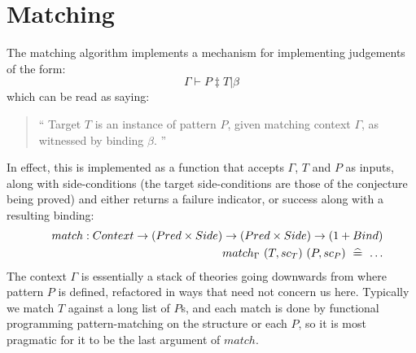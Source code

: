 \section{Matching}\label{sec:matching}

The matching algorithm implements a mechanism for implementing
judgements of the form:
\[
\Gamma\vdash P \ddagger T | \beta
\]
which can be read as saying:
\begin{quote}
  ``
  Target $T$ is an instance of pattern $P$, given matching context $\Gamma$,
  as witnessed by binding $\beta$.
  ''
\end{quote}
In effect,
this is implemented as a function that accepts $\Gamma$, $T$ and $P$
as inputs, along with side-conditions
(the target side-conditions are those of the conjecture being proved)
and either returns a failure indicator, or success along with a resulting
binding:
\begin{eqnarray*}
  && match : Context \rightarrow (Pred\times Side) \rightarrow (Pred\times Side) \rightarrow (1 + Bind)
\\ && match_{\Gamma}~(T,sc_T)~(P,sc_P) \mathrel{~\widehat{=\!\!\!\!=}}~ \ldots
\end{eqnarray*}
The context $\Gamma$ is essentially a stack of theories
going downwards from where pattern $P$ is defined,
refactored in ways that need not concern us here.
Typically we match $T$ against a long list of $P$s,
and each match is done by functional programming pattern-matching
on the structure or each $P$, so it is most pragmatic for it to be the last argument
of $match$.

